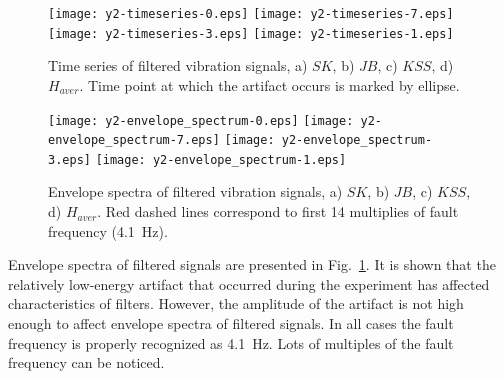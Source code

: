 \documentclass[11pt]{article} %
\begin{document}
\begin{figure}[!ht]
\begin{center}
\texttt{[image: y2-timeseries-0.eps]}
\texttt{[image: y2-timeseries-7.eps]}
\texttt{[image: y2-timeseries-3.eps]}
\texttt{[image: y2-timeseries-1.eps]}
\caption{Time series of filtered vibration signals, a) $SK$, b) $JB$, c) $KSS$, d) $H_{aver}$. Time point at which the artifact occurs is marked by ellipse.\label{f:timeseries_filtered}}
\texttt{[image: y2-envelope\_spectrum-0.eps]}
\texttt{[image: y2-envelope\_spectrum-7.eps]}
\texttt{[image: y2-envelope\_spectrum-3.eps]}
\texttt{[image: y2-envelope\_spectrum-1.eps]}
\caption{Envelope spectra of filtered vibration signals, a) $SK$, b) $JB$, c) $KSS$, d) $H_{aver}$. Red dashed lines correspond to first 14 multiplies of fault frequency (4.1~Hz).\label{f:spectra_filtered}}
\end{center}
\end{figure}
Envelope spectra of filtered signals are presented in Fig.~\ref{f:spectra_filtered}. It is shown that the relatively low-energy artifact that occurred during the experiment has affected characteristics of filters. However, the amplitude of the artifact is not high enough to affect envelope spectra of filtered signals. In all cases the fault frequency is properly recognized as 4.1~Hz. Lots of multiples of the fault frequency can be noticed.
\end{document}
